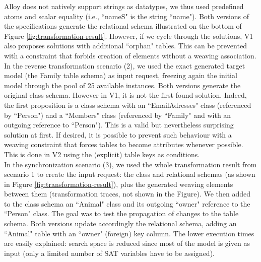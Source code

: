 \documentclass{llncs}
\begin{document}
Alloy does not natively support strings as datatypes, we thus used predefined atoms and scalar equality (i.e., ``nameS" is the string ``name"). Both versions of the specifications generate the relational schema illustrated on the bottom of Figure \ref{fig:transformation-result}. However, if we cycle through the solutions, V1 also proposes solutions with additional ``orphan" tables. This can be prevented with a constraint that forbids creation of elements without a weaving association.\\
In the reverse transformation scenario (2), we used the exact generated target model (the Family table schema) as input request, freezing again the initial model through the pool of 25 available instances. Both versions generate the original class schema. However in V1, it is not the first found solution. Indeed, the first proposition is a class schema with an ``EmailAdresses" class (referenced by ``Person") and a ``Members" class (referenced by ``Family" and with an outgoing reference to ``Person"). This is a valid but nevertheless surprising solution at first. If desired, it is possible to prevent such behaviour with a weaving constraint that forces tables to become attributes whenever possible. This is done in V2 using the (explicit) table keys as conditions.\\
In the synchronization scenario (3), we used the whole transformation result from scenario 1 to create the input request: the class and relational schemas (as shown in Figure \ref{fig:transformation-result}), plus the generated weaving elements between them (transformation traces, not shown in the Figure). We then added to the class schema an ``Animal" class and its outgoing ``owner" reference to the ``Person" class. The goal was to test the propagation of changes to the table schema. Both versions update accordingly the relational schema, adding an ``Animal" table with an ``owner" (foreign) key column. The lower execution times are easily explained: search space is reduced since most of the model is given as input (only a limited number of SAT variables have to be assigned).
%
\end{document}
